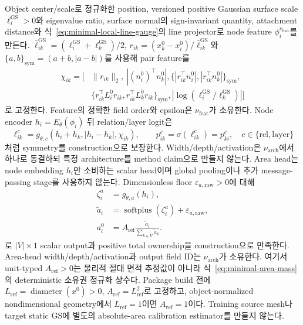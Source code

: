 \documentclass[11pt]{article}
\begin{document}
Object center/scale로 정규화한 position, versioned positive Gaussian surface scale
\(\ell_i^{\mathrm{GS}}>0\)와 eigenvalue ratio, surface normal의 sign-invariant
quantity, attachment distance와 식~\eqref{eq:minimal-local-line-gauge}의 line projector로 node feature
\(\phi_i^{\nu_{\mathrm{feat}}}\)를 만든다.
\(\bar\ell_{ik}^{\mathrm{GS}}=(\ell_i^{\mathrm{GS}}+\ell_k^{\mathrm{GS}})/2\),
\(r_{ik}=(x_k^0-x_i^0)/\bar\ell_{ik}^{\mathrm{GS}}\)와
\(\{a,b\}_{\mathrm{sym}}=(a+b,|a-b|)\)를 사용해 pair feature를
\begin{equation}
\begin{aligned}
  \chi_{ik}=\bigl[&\|r_{ik}\|_2,\ |(n_i^0)^\top n_k^0|,
  \{ |r_{ik}^\top n_i^0|,|r_{ik}^\top n_k^0|\}_{\mathrm{sym}},\\
  &\{r_{ik}^\top L_i^0r_{ik},r_{ik}^\top L_k^0r_{ik}\}_{\mathrm{sym}},
  |\log(\ell_i^{\mathrm{GS}}/\ell_k^{\mathrm{GS}})|\bigr]
\end{aligned}
  \label{eq:minimal-r1-symmetric-features}
\end{equation}
로 고정한다. Feature의 정확한 field order와 epsilon은 \(\nu_{\mathrm{feat}}\)가 소유한다.
Node encoder \(h_i=E_\theta(\phi_i)\) 뒤 relation/layer logit은
\begin{equation}
  \ell_{ik}^{c}
  =g_{\theta,c}\!\left(h_i+h_k,|h_i-h_k|,\chi_{ik}\right),\qquad
  p_{ik}^{c}=\sigma(\ell_{ik}^{c})=p_{ki}^{c},\quad
  c\in\{\mathrm{rel},\mathrm{layer}\}
  \label{eq:minimal-r1-symmetric-logit}
\end{equation}
처럼 symmetry를 construction으로 보장한다. Width/depth/activation은
\(\nu_{\mathrm{arch}}\)에서 하나로 동결하되 특정 architecture를 method claim으로 만들지 않는다.
Area head는 node embedding \(h_i\)만 소비하는 scalar head이며 global pooling이나 추가
message-passing stage를 사용하지 않는다. Dimensionless floor
\(\varepsilon_{a,\mathrm{raw}}>0\)에 대해
\begin{equation}
\begin{aligned}
  \zeta_i^a
  &=g_{\theta,a}(h_i),\\
  \widetilde a_i
  &=\operatorname{softplus}(\zeta_i^a)+\varepsilon_{a,\mathrm{raw}},\\
  a_i^0
  &=A_{\mathrm{ref}}\frac{\widetilde a_i}{\sum_{k\in V}\widetilde a_k}.
\end{aligned}
  \label{eq:minimal-r1-area-decode}
\end{equation}
로 \(\lvert V\rvert\times1\) scalar output과 positive total ownership을 construction으로 만족한다.
Area-head width/depth/activation과 output field ID는 \(\nu_{\mathrm{arch}}\)가 소유한다.
여기서 unit-typed \(A_{\mathrm{ref}}>0\)는 물리적 절대 면적 추정값이 아니라
식~\eqref{eq:minimal-area-mass}의 deterministic 소유권 정규화 상수다.
Package build 전에 \(L_{\mathrm{ref}}=\operatorname{diameter}(x^0)>0\),
\(A_{\mathrm{ref}}=L_{\mathrm{ref}}^2\)로 고정하고, object-normalized nondimensional geometry에서
\(L_{\mathrm{ref}}=1\)이면 \(A_{\mathrm{ref}}=1\)이다. Training source mesh나 target static GS에
별도의 absolute-area calibration estimator를 만들지 않는다.
\end{document}
